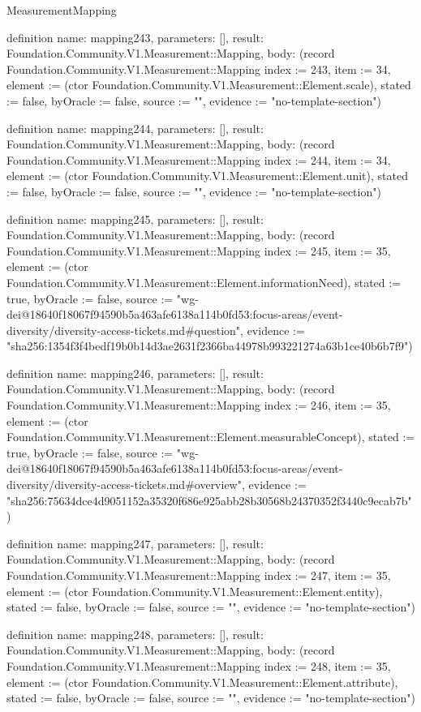 \begin{lexlean}{MeasurementMapping}
\begin{semanticmodule}
definition{
  name: mapping243,
  parameters: [],
  result: Foundation.Community.V1.Measurement::Mapping,
  body: (record Foundation.Community.V1.Measurement::Mapping {index := 243, item := 34, element := (ctor Foundation.Community.V1.Measurement::Element.scale), stated := false, byOracle := false, source := "", evidence := "no-template-section"})
}

definition{
  name: mapping244,
  parameters: [],
  result: Foundation.Community.V1.Measurement::Mapping,
  body: (record Foundation.Community.V1.Measurement::Mapping {index := 244, item := 34, element := (ctor Foundation.Community.V1.Measurement::Element.unit), stated := false, byOracle := false, source := "", evidence := "no-template-section"})
}

definition{
  name: mapping245,
  parameters: [],
  result: Foundation.Community.V1.Measurement::Mapping,
  body: (record Foundation.Community.V1.Measurement::Mapping {index := 245, item := 35, element := (ctor Foundation.Community.V1.Measurement::Element.informationNeed), stated := true, byOracle := false, source := "wg-dei@18640f18067f94590b5a463afe6138a114b0fd53:focus-areas/event-diversity/diversity-access-tickets.md#question", evidence := "sha256:1354f3f4bedf19b0b14d3ae2631f2366ba44978b993221274a63b1ce40b6b7f9"})
}

definition{
  name: mapping246,
  parameters: [],
  result: Foundation.Community.V1.Measurement::Mapping,
  body: (record Foundation.Community.V1.Measurement::Mapping {index := 246, item := 35, element := (ctor Foundation.Community.V1.Measurement::Element.measurableConcept), stated := true, byOracle := false, source := "wg-dei@18640f18067f94590b5a463afe6138a114b0fd53:focus-areas/event-diversity/diversity-access-tickets.md#overview", evidence := "sha256:75634dce4d9051152a35320f686e925abb28b30568b24370352f3440c9ecab7b"})
}

definition{
  name: mapping247,
  parameters: [],
  result: Foundation.Community.V1.Measurement::Mapping,
  body: (record Foundation.Community.V1.Measurement::Mapping {index := 247, item := 35, element := (ctor Foundation.Community.V1.Measurement::Element.entity), stated := false, byOracle := false, source := "", evidence := "no-template-section"})
}

definition{
  name: mapping248,
  parameters: [],
  result: Foundation.Community.V1.Measurement::Mapping,
  body: (record Foundation.Community.V1.Measurement::Mapping {index := 248, item := 35, element := (ctor Foundation.Community.V1.Measurement::Element.attribute), stated := false, byOracle := false, source := "", evidence := "no-template-section"})
}


\end{semanticmodule}
\end{lexlean}

